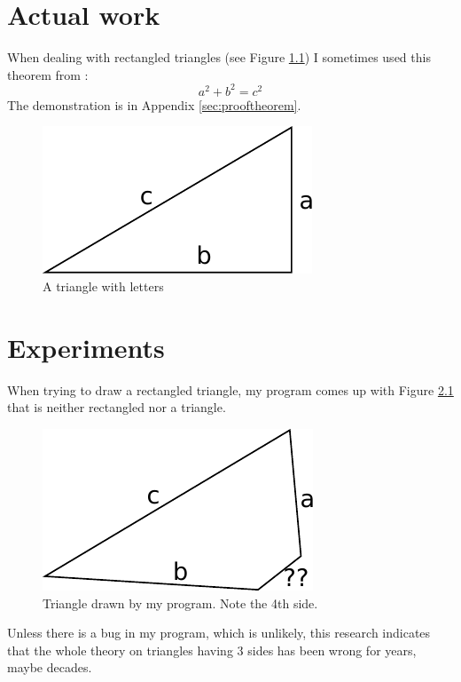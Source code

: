 \documentclass{thesisreport}
\begin{document}
 \chapter{Actual work}
  
 
 When dealing with rectangled triangles (see Figure \ref{triangle}) I sometimes used this theorem from \cite{pythm001}:
 \begin{equation}\label{theo}
  a^2 + b^2 = c^2
 \end{equation}The demonstration is in Appendix \ref{sec:prooftheorem}.
 
 \begin{figure}[h]\centering
  \includegraphics[width=.5\linewidth]{triangle1}
  \caption{A triangle with letters} \label{triangle}
 \end{figure}
 
 


 
 
 \chapter{Experiments}
 
 When trying to draw a rectangled triangle, my program comes up with Figure \ref{triangle2} that is neither rectangled nor a triangle.
 
  \begin{figure}[h]\centering
  \includegraphics[width=.5\linewidth]{triangle2}
  \caption{Triangle drawn by my program. Note the 4th side.} \label{triangle2}
 \end{figure}
 
Unless there is a bug in my program, which is unlikely, this research indicates that the whole theory on triangles having 3 sides has been wrong for years, maybe decades. \cite{Bouabdalla2007}
 
\end{document}
